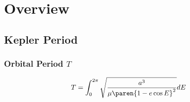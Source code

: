 % 

\section{Overview}
\subsection{Kepler Period}

\begin{frame}\frametitle{Orbital Period $T$}
\begin{equation}
	T = \int_{0}^{2\pi} \sqrt{ \frac{a^{3}} {\mu \paren{1- e\cos E}^2 }}  dE
\end{equation}
\end{frame}


\endinput  %
